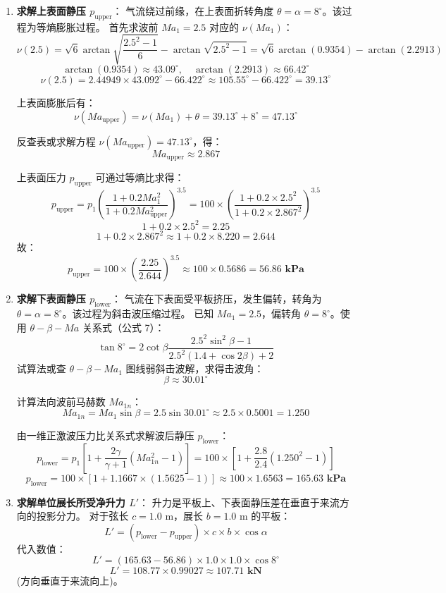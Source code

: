 \documentclass[11pt,a4paper]{ctexart}
\begin{document}
\begin{enumerate}
    \item \textbf{求解上表面静压 $p_{\text{upper}}$}：
    气流绕过前缘，在上表面折转角度 $\theta = \alpha = 8^\circ$。该过程为等熵膨胀过程。
    首先求波前 $Ma_1 = 2.5$ 对应的 $\nu(Ma_1)$：
    \[
    \nu(2.5) = \sqrt{6} \arctan \sqrt{\frac{2.5^2 - 1}{6}} - \arctan \sqrt{2.5^2 - 1} = \sqrt{6} \arctan(0.9354) - \arctan(2.2913)
    \]
    \[
    \arctan(0.9354) \approx 43.09^\circ, \quad \arctan(2.2913) \approx 66.42^\circ
    \]
    \[
    \nu(2.5) = 2.44949 \times 43.092^\circ - 66.422^\circ \approx 105.55^\circ - 66.422^\circ = 39.13^\circ
    \]
    
    上表面膨胀后有：
    \[
    \nu(Ma_{\text{upper}}) = \nu(Ma_1) + \theta = 39.13^\circ + 8^\circ = 47.13^\circ
    \]
    
    反查表或求解方程 $\nu(Ma_{\text{upper}}) = 47.13^\circ$，得：
    \[
    Ma_{\text{upper}} \approx 2.867
    \]
    
    上表面压力 $p_{\text{upper}}$ 可通过等熵比求得：
    \[
    p_{\text{upper}} = p_1 \left( \frac{1 + 0.2 Ma_1^2}{1 + 0.2 Ma_{\text{upper}}^2} \right)^{3.5} = 100 \times \left( \frac{1 + 0.2 \times 2.5^2}{1 + 0.2 \times 2.867^2} \right)^{3.5}
    \]
    \[
    1 + 0.2 \times 2.5^2 = 2.25
    \]
    \[
    1 + 0.2 \times 2.867^2 \approx 1 + 0.2 \times 8.220 = 2.644
    \]
    故：
    \[
    p_{\text{upper}} = 100 \times \left(\frac{2.25}{2.644}\right)^{3.5} \approx 100 \times 0.5686 = \mathbf{56.86\text{ kPa}}
    \]

    \item \textbf{求解下表面静压 $p_{\text{lower}}$}：
    气流在下表面受平板挤压，发生偏转，转角为 $\theta = \alpha = 8^\circ$。该过程为斜击波压缩过程。
    已知 $Ma_1 = 2.5$，偏转角 $\theta = 8^\circ$。使用 $\theta-\beta-Ma$ 关系式（公式 7）：
    \[
    \tan 8^\circ = 2 \cot \beta \frac{2.5^2 \sin^2 \beta - 1}{2.5^2 (1.4 + \cos 2\beta) + 2}
    \]
    试算法或查 $\theta-\beta-Ma_1$ 图线弱斜击波解，求得击波角：
    \[
    \beta \approx 30.01^\circ
    \]
    
    计算法向波前马赫数 $Ma_{1n}$：
    \[
    Ma_{1n} = Ma_1 \sin \beta = 2.5 \sin 30.01^\circ \approx 2.5 \times 0.5001 = 1.250
    \]
    
    由一维正激波压力比关系式求解波后静压 $p_{\text{lower}}$：
    \[
    p_{\text{lower}} = p_1 \left[ 1 + \frac{2\gamma}{\gamma+1} \left( Ma_{1n}^2 - 1 \right) \right] = 100 \times \left[ 1 + \frac{2.8}{2.4} \left( 1.250^2 - 1 \right) \right]
    \]
    \[
    p_{\text{lower}} = 100 \times \left[ 1 + 1.1667 \times (1.5625 - 1) \right] \approx 100 \times 1.6563 = \mathbf{165.63\text{ kPa}}
    \]

    \item \textbf{求解单位展长所受净升力 $L'$}：
    升力是平板上、下表面静压差在垂直于来流方向的投影分力。
    对于弦长 $c = 1.0\text{ m}$，展长 $b = 1.0\text{ m}$ 的平板：
    \[
    L' = (p_{\text{lower}} - p_{\text{upper}}) \times c \times b \times \cos \alpha
    \]
    代入数值：
    \[
    L' = (165.63 - 56.86) \times 1.0 \times 1.0 \times \cos 8^\circ
    \]
    \[
    L' = 108.77 \times 0.99027 \approx \mathbf{107.71\text{ kN}}
    \]
    (方向垂直于来流向上)。
\end{enumerate}
\end{document}

